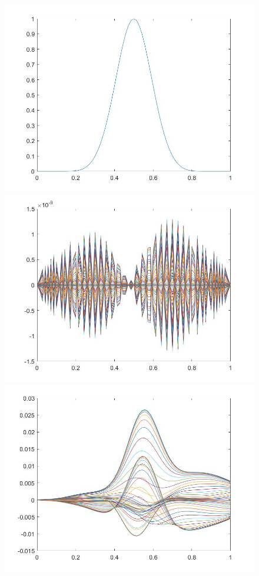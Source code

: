 \documentclass[11pt, a4paper]{article}
\theoremstyle{definition}
\begin{document}
	\begin{figure}[h]
		\includegraphics[scale=0.25]{Pert2.jpg}
		\includegraphics[scale=0.25]{ErrPert2.jpg}
		\includegraphics[scale=0.25]{ErrrhoPert2.jpg}

\end{figure}
\end{document}
